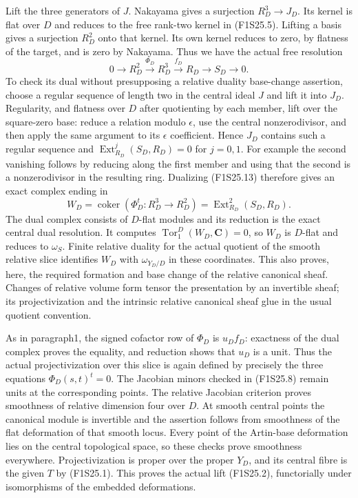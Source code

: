 Lift the three generators of $J$. Nakayama gives a surjection
$R_D^3\to J_D$. Its kernel is flat over $D$ and reduces to the
free rank-two kernel in (F1S25.5). Lifting a basis gives a
surjection $R_D^2$ onto that kernel. Its own kernel reduces to
zero, by flatness of the target, and is zero by Nakayama. Thus
we have the actual free resolution
\[
 0\longrightarrow R_D^2\xrightarrow{\Phi_D}R_D^3
       \xrightarrow{f_D}R_D\longrightarrow S_D\longrightarrow0.
 \tag{F1S25.13}
\]
To check its dual without presupposing a relative duality
base-change assertion, choose a regular sequence of length two
in the central ideal $J$ and lift it into $J_D$. Regularity,
and flatness over $D$ after quotienting by each member, lift
over the square-zero base: reduce a relation modulo $\epsilon$,
use the central nonzerodivisor, and then apply the same argument
to its $\epsilon$ coefficient. Hence $J_D$ contains such a
regular sequence and
$\operatorname{Ext}_{R_D}^j(S_D,R_D)=0$ for $j=0,1$.
For example the second vanishing follows by reducing along the
first member and using that the second is a nonzerodivisor in
the resulting ring. Dualizing (F1S25.13) therefore gives an exact
complex ending in
\[
 W_D=\operatorname{coker}(\Phi_D^t:R_D^3\to R_D^2)
        =\operatorname{Ext}_{R_D}^2(S_D,R_D).
 \tag{F1S25.14}
\]
The dual complex consists of $D$-flat modules and its reduction
is the exact central dual resolution. It computes
$\operatorname{Tor}_1^D(W_D,\mathbf C)=0$, so $W_D$ is
$D$-flat and reduces to $\omega_S$. Finite relative duality
for the actual quotient of the smooth relative slice identifies
$W_D$ with $\omega_{Y_D/D}$ in these coordinates. This also
proves, here, the required formation and base change of the
relative canonical sheaf. Changes of relative volume form tensor
the presentation by an invertible sheaf; its projectivization
and the intrinsic relative canonical sheaf glue in the usual
quotient convention.

As in paragraph1, the signed cofactor row of $\Phi_D$ is
$u_D f_D$: exactness of the dual complex proves the equality,
and reduction shows that $u_D$ is a unit. Thus the actual
projectivization over this slice is again defined by precisely
the three equations $\Phi_D(s,t)^t=0$. The Jacobian minors
checked in (F1S25.8) remain units at the corresponding points.
The relative Jacobian criterion proves smoothness of relative
dimension four over $D$. At smooth central points the canonical
module is invertible and the assertion follows from smoothness
of the flat deformation of that smooth locus. Every point of
the Artin-base deformation lies on the central topological
space, so these checks prove smoothness everywhere.
Projectivization is proper over the proper $Y_D$, and its
central fibre is the given $T$ by (F1S25.1). This proves the
actual lift (F1S25.2), functorially under isomorphisms of the
embedded deformations.

